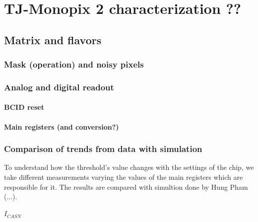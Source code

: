 
\chapter{TJ-Monopix 2 characterization ??}

\section{Matrix and flavors}

\subsection{Mask (operation) and noisy pixels}

\subsection{Analog and digital readout}

\subsubsection{BCID reset}
\begin{comment}
REFERENZE
\end{comment}

\subsubsection{Main registers (and conversion?)}



\subsection{Comparison of trends from data with simulation}

To understand how the threshold's value changes with the settings of the chip, we take different measurements varying the values of the main registers which are responsible for it.
The results are compared with simultion done by Hung Pham (...).

\subsubsection{$I_{CASN}$}

